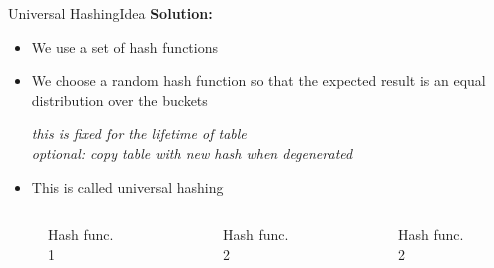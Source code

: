\begin{frame}{Universal Hashing}{Idea}
  \textbf{Solution:}
  \begin{itemize}
    \setlength\itemsep{0.75em}
    \item <1->
      We use a set of hash functions
    \item <2->
      We choose a random hash function so that the {\color{Mittel-Blau}expected result} is an equal
      distribution over the buckets
      \begin{center}
        \it{} this is fixed for the lifetime of table\\
        \it{}  optional: copy table with new hash when degenerated
      \end{center}
    \item <3->
      This is called {\color{Mittel-Blau}universal hashing}
  \end{itemize}
  \begin{columns}
    \begin{column}{0.33\linewidth}
      \begin{figure}[!h]
        \begin{adjustbox}{height=0.8\linewidth}
          
        \end{adjustbox}
        \caption{Hash func. 1}
        \label{fig:universal_hashing:hash_function_crossing}
      \end{figure}
    \end{column}
    \begin{column}{0.33\linewidth}
      \begin{figure}[!h]
        \begin{adjustbox}{height=0.8\linewidth}
          
        \end{adjustbox}
        \caption{Hash func. 2}
        \label{fig:universal_hashing:hash_function_normal}
      \end{figure}
    \end{column}
    \begin{column}{0.33\linewidth}
      \begin{figure}[!h]
        \begin{adjustbox}{height=0.8\linewidth}
          
        \end{adjustbox}
        \caption{Hash func. 2}
        \label{fig:universal_hashing:hash_function_colliding}
      \end{figure}
    \end{column}
  \end{columns}
\end{frame}

